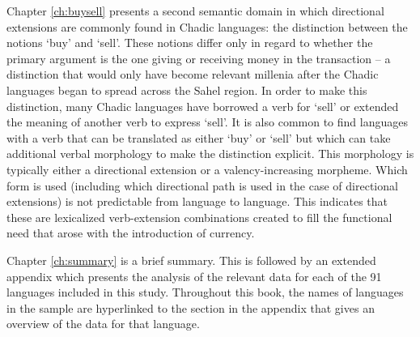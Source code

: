 \largerpage
Chapter \ref{ch:buysell} presents a second semantic domain in which directional extensions are commonly found in Chadic languages: the distinction between the notions `buy' and `sell'. These notions differ only in regard to whether the primary argument is the one giving or receiving money in the transaction -- a distinction that would only have become relevant millenia after the Chadic languages began to spread across the Sahel region. In order to make this distinction, many Chadic languages have borrowed a verb for `sell' or extended the meaning of another verb to express `sell'. It is also common to find languages with a verb that can be translated as either `buy' or `sell' but which can take additional verbal morphology to make the distinction explicit. This morphology is typically either a directional extension or a valency-increasing morpheme. Which form is used (including which directional path is used in the case of directional extensions) is not predictable from language to language. This indicates that these are lexicalized verb-extension combinations created to fill the functional need that arose with the introduction of currency. 

\largerpage
Chapter \ref{ch:summary} is a brief summary. This is followed by an extended appendix which presents the analysis of the relevant data for each of the 91 languages included in this study. Throughout this book, the names of languages in the sample are hyperlinked to the section in the appendix that gives an overview of the data for that language.

